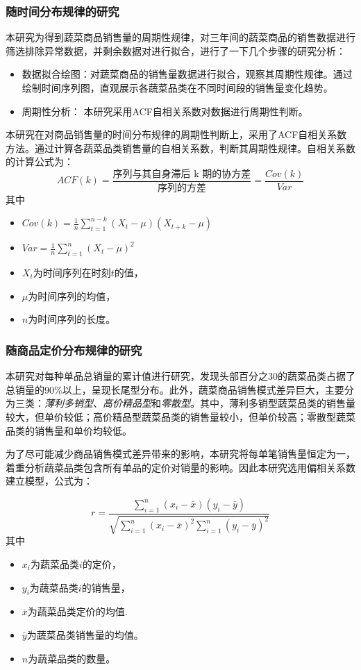 \documentclass{article}
\begin{document}
\subsubsection{随时间分布规律的研究}
本研究为得到蔬菜商品销售量的周期性规律，对三年间的蔬菜商品的销售数据进行筛选排除异常数据，并剩余数据对进行拟合，进行了一下几个步骤的研究分析：

\begin{itemize}
    \item 数据拟合绘图：对蔬菜商品的销售量数据进行拟合，观察其周期性规律。通过绘制时间序列图，直观展示各蔬菜品类在不同时间段的销售量变化趋势。
    \item 周期性分析： 本研究采用ACF自相关系数对数据进行周期性判断。
\end{itemize}

本研究在对商品销售量的时间分布规律的周期性判断上，采用了ACF自相关系数方法。通过计算各蔬菜品类销售量的自相关系数，判断其周期性规律。自相关系数的计算公式为：
\[ACF(k) = \frac{\text{序列与其自身滞后 k 期的协方差}}{\text{序列的方差}} = \frac{Cov(k)}{Var}\]
其中\begin{itemize}
    \item $Cov(k) = \frac{1}{n} \sum_{t=1}^{n-k} (X_t - \mu)(X_{t+k} - \mu)$
    \item $Var = \frac{1}{n} \sum_{t=1}^{n} (X_t - \mu)^2$
    \item $X_t$为时间序列在时刻$t$的值，
    \item $\mu$为时间序列的均值，
    \item $n$为时间序列的长度。
\end{itemize}

\subsubsection{随商品定价分布规律的研究}
本研究对每种单品总销量的累计值进行研究，发现头部百分之30的蔬菜品类占据了总销量的90\%以上，呈现长尾型分布。此外，蔬菜商品销售模式差异巨大，主要分为三类：\textit{薄利多销型}、\textit{高价精品型}和\textit{零散型}。其中，薄利多销型蔬菜品类的销售量较大，但单价较低；高价精品型蔬菜品类的销售量较小，但单价较高；零散型蔬菜品类的销售量和单价均较低。

为了尽可能减少商品销售模式差异带来的影响，本研究将每单笔销售量恒定为一，着重分析蔬菜品类包含所有单品的定价对销量的影响。因此本研究选用偏相关系数建立模型，公式为：

\[
r = \frac{
    \sum_{i=1}^{n} (x_i - \bar{x})(y_i - \bar{y})
}{
    \sqrt{
        \sum_{i=1}^{n} (x_i - \bar{x})^2
        \sum_{i=1}^{n} (y_i - \bar{y})^2
    }
}
\]
其中
\begin{itemize}
    \item $x_i$为蔬菜品类$i$的定价，
    \item $y_i$为蔬菜品类$i$的销售量，
    \item $\bar{x}$为蔬菜品类定价的均值.
    \item $\bar{y}$为蔬菜品类销售量的均值。
    \item $n$为蔬菜品类的数量。
\end{itemize}
\end{document}

